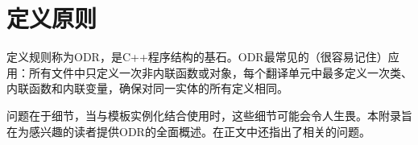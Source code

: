 \chapter{定义原则}
定义规则称为ODR，是C++程序结构的基石。ODR最常见的（很容易记住）应用：所有文件中只定义一次非内联函数或对象，每个翻译单元中最多定义一次类、内联函数和内联变量，确保对同一实体的所有定义相同。

问题在于细节，当与模板实例化结合使用时，这些细节可能会令人生畏。本附录旨在为感兴趣的读者提供ODR的全面概述。在正文中还指出了相关的问题。


